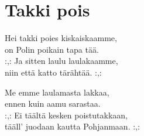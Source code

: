 \section{Takki pois}

Hei takki poies kiskaiskaamme,\\
on Polin poikain tapa tää.\\
:,: Ja sitten laulu laulakaamme,\\
niin että katto tärähtää. :,:

Me emme laulamasta lakkaa,\\
ennen kuin aamu sarastaa.\\
:,: Ei täältä kesken poistutakkaan,\\
tääll’ juodaan kautta Pohjanmaan. :,: